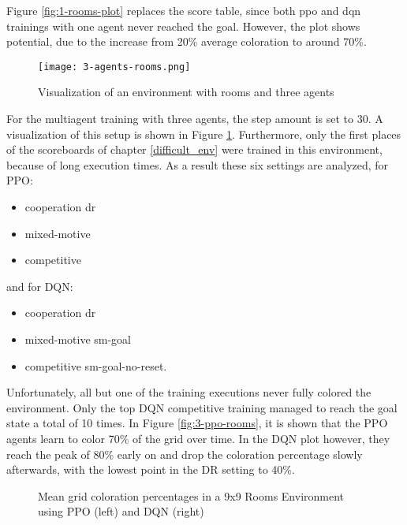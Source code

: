 Figure \ref{fig:1-rooms-plot} replaces the score table, since both ppo and dqn trainings with one agent never reached the goal. However, the plot shows potential, due to the increase from 20\% average coloration to around 70\%.

\begin{figure}[hpbt]
    \centering
    \texttt{[image: 3-agents-rooms.png]}\\
    \caption[Three Agents in a 9x9 Rooms Environment]{Visualization of an environment with rooms and three agents}\label{fig:3-agents-rooms}
\end{figure}

For the multiagent training with three agents, the step amount is set to 30. A visualization of this setup is shown in Figure \ref{fig:3-agents-rooms}. Furthermore, only the first places of the scoreboards of chapter \ref{difficult_env} were trained in this environment, because of long execution times. As a result these six settings are analyzed, for PPO:
\begin{itemize}
    \item cooperation dr
    \item mixed-motive
    \item competitive
\end{itemize}
    and for DQN:
\begin{itemize}
    \item cooperation dr
    \item mixed-motive sm-goal
    \item competitive sm-goal-no-reset.
\end{itemize}

Unfortunately, all but one of the training executions never fully colored the environment. Only the top DQN competitive training managed to reach the goal state a total of 10 times. In Figure \ref{fig:3-ppo-rooms}, it is shown that the PPO agents learn to color 70\% of the grid over time. In the DQN plot however, they reach the peak of 80\% early on and drop the coloration percentage slowly afterwards, with the lowest point in the DR setting to 40\%.  

\begin{figure}[hpbt]
    \centering
    \hspace{0.01\textwidth}
    \caption[Mean Coloration Percentage of the Top Modes in a 9x9 Rooms Environment]{Mean grid coloration percentages in a 9x9 Rooms Environment using PPO (left) and DQN (right)}
    \label{fig:multipic_plots_rooms} 
\end{figure}